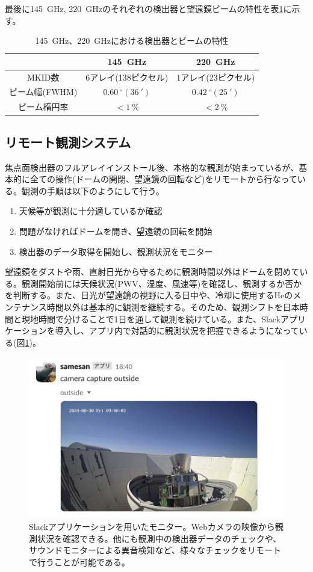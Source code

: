 最後に\SI{145}{GHz}, \SI{220}{GHz}のそれぞれの検出器と望遠鏡ビームの特性を表\ref{mkid_table}に示す。

\begin{table}[htbp]
  \centering
  \caption{\SI{145}{GHz}、\SI{220}{GHz}における検出器とビームの特性\cite{choi_doctor}}
  \vspace{3mm}
  \begin{tabular}{ccc} \hline\hline
    & \SI{145}{GHz} & \SI{220}{GHz} \\ \hline
    MKID数 & 6アレイ(138ピクセル) & 1アレイ(23ピクセル)\\
    ビーム幅(FWHM) & $\SI{0.60}{^{\circ}}(\SI{36}{'})$ & $\SI{0.42}{^{\circ}}(\SI{25}{'})$\\
    ビーム楕円率 & $ < \SI{1}{\%} $ & $ < \SI{2}{\%} $\\ \hline\hline
  \end{tabular}
  \label{mkid_table}
\end{table}

\subsection{リモート観測システム}
焦点面検出器のフルアレイインストール後、本格的な観測が始まっているが、基本的に全ての操作(ドームの開閉、望遠鏡の回転など)をリモートから行なっている。観測の手順は以下のようにして行う。
\begin{enumerate}
  \item 天候等が観測に十分適しているか確認
  \item 問題がなければドームを開き、望遠鏡の回転を開始
  \item 検出器のデータ取得を開始し、観測状況をモニター
\end{enumerate}
望遠鏡をダストや雨、直射日光から守るために観測時間以外はドームを閉めている。観測開始前には天候状況(PWV、湿度、風速等)を確認し、観測するか否かを判断する。また、日光が望遠鏡の視野に入る日中や、冷却に使用するHeのメンテナンス時間以外は基本的に観測を継続する。そのため、観測シフトを日本時間と現地時間で分けることで1日を通して観測を続けている。また、Slackアプリケーションを導入し、アプリ内で対話的に観測状況を把握できるようになっている(図\ref{samesan})。

\begin{figure}[htbp]
  \centering
  \includegraphics[width=0.7\columnwidth]{3_GB/figs/webcam.png}
  \caption{Slackアプリケーションを用いたモニター。Webカメラの映像から観測状況を確認できる。他にも観測中の検出器データのチェックや、サウンドモニターによる異音検知など、様々なチェックをリモートで行うことが可能である。}
  \label{samesan}
\end{figure}

